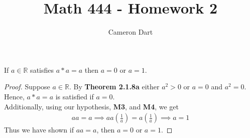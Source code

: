 \documentclass[12pt]{article}
\newcommand{\R}{\mathbb{R}}
\newenvironment{claim}[2][Claim]{\begin{trivlist}
		\item[\hskip \labelsep {\bfseries #1}\hskip \labelsep {\bfseries #2}]}{\end{trivlist}}
\begin{document}
	\title{Math 444 - Homework 2}
	\author{Cameron Dart}
	\maketitle
	\begin{claim}{2.1.4}
		If $a \in \R$ satisfies $a * a = a $ then $a = 0$ or $a = 1$.
 	\end{claim}
	\begin{proof}
	Suppose $a \in \R$. By \textbf{Theorem 2.1.8a} either $a^2 > 0$ or $a = 0$ and $a^2 = 0$. Hence, $a * a = a$ is satisfied if $a = 0$.\\
	Additionally, using our hypothesis, \textbf{M3}, and \textbf{M4}, we get \\
	\begin{align*}
		a a  = a \implies a  a \left(\frac{1}{a}\right) = a \left( \frac{1}{a}\right ) \implies a = 1
	\end{align*}
	Thus we have shown if $ a a = a$, then $a = 0$ or $a = 1$.
	\end{proof}
\end{document}
